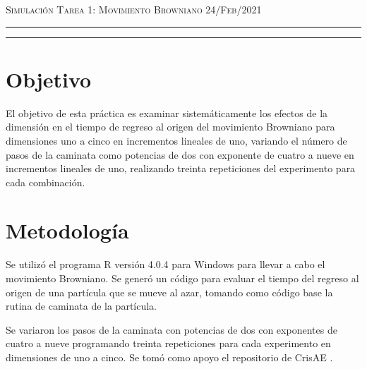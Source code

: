 \documentclass[12pt]{amsart}
\begin{document}
\pagestyle{empty}



\thispagestyle{empty}

{\scshape Simulación} \hfill {\scshape \Large Tarea 1: Movimiento Browniano} \hfill  {\scshape 24/Feb/2021}
\author{C. María Montemayor Palos}
\maketitle

\hrule
\hrule
\bigskip

\bigskip

\section{Objetivo}
El objetivo de esta práctica es examinar sistemáticamente los efectos de la dimensión en el tiempo de regreso al origen del movimiento Browniano para dimensiones uno a cinco en incrementos lineales de uno, variando el número de pasos de la caminata como potencias de dos con exponente de cuatro a nueve en incrementos lineales de uno, realizando treinta repeticiones del experimento para cada combinación.

\section{Metodología}
Se utilizó el programa R versión 4.0.4 \cite{R} para Windows para llevar a cabo el movimiento Browniano. Se generó un código para evaluar el tiempo del regreso al origen de una partícula que se mueve al azar, tomando como código base la rutina de caminata \cite{Dra.Elisa} de la partícula.

Se variaron los pasos de la caminata con potencias de dos con exponentes de cuatro a nueve programando treinta repeticiones para cada experimento en dimensiones de uno a cinco. Se tomó como apoyo el repositorio de CrisAE \cite{CrisAE}.
\end{document}
